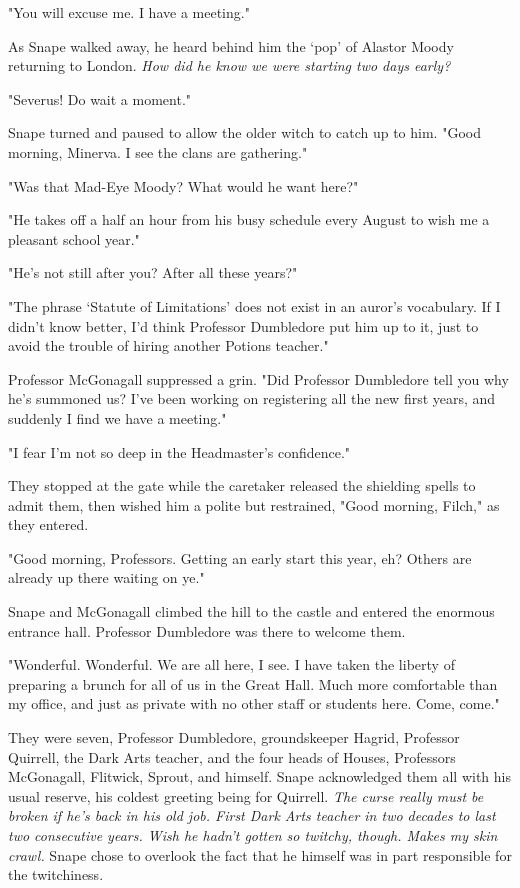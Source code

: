 "You will excuse me. I have a meeting."

As Snape walked away, he heard behind him the `pop' of Alastor Moody returning to London. \emph{How did he know we were starting two days early?}

"Severus! Do wait a moment."

Snape turned and paused to allow the older witch to catch up to him. "Good morning, Minerva. I see the clans are gathering."

"Was that Mad-Eye Moody? What would he want here?"

"He takes off a half an hour from his busy schedule every August to wish me a pleasant school year."

"He's not still after you? After all these years?"

"The phrase `Statute of Limitations' does not exist in an auror's vocabulary. If I didn't know better, I'd think Professor Dumbledore put him up to it, just to avoid the trouble of hiring another Potions teacher."

Professor McGonagall suppressed a grin. "Did Professor Dumbledore tell you why he's summoned us? I've been working on registering all the new first years, and suddenly I find we have a meeting."

"I fear I'm not so deep in the Headmaster's confidence."

They stopped at the gate while the caretaker released the shielding spells to admit them, then wished him a polite but restrained, "Good morning, Filch," as they entered.

"Good morning, Professors. Getting an early start this year, eh? Others are already up there waiting on ye."

Snape and McGonagall climbed the hill to the castle and entered the enormous entrance hall. Professor Dumbledore was there to welcome them.

"Wonderful. Wonderful. We are all here, I see. I have taken the liberty of preparing a brunch for all of us in the Great Hall. Much more comfortable than my office, and just as private with no other staff or students here. Come, come."

They were seven, Professor Dumbledore, groundskeeper Hagrid, Professor Quirrell, the Dark Arts teacher, and the four heads of Houses, Professors McGonagall, Flitwick, Sprout, and himself. Snape acknowledged them all with his usual reserve, his coldest greeting being for Quirrell. \emph{The curse really must be broken if he's back in his old job. First Dark Arts teacher in two decades to last two consecutive years. Wish he hadn't gotten so twitchy, though. Makes my skin crawl.} Snape chose to overlook the fact that he himself was in part responsible for the twitchiness.

